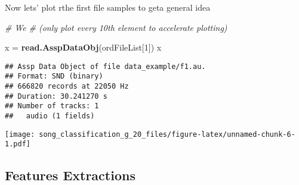 \documentclass[]{article}
\newenvironment{Shaded}{\begin{snugshade}}{\end{snugshade}}
\newcommand{\KeywordTok}[1]{\textcolor[rgb]{0.13,0.29,0.53}{\textbf{#1}}}
\newcommand{\DataTypeTok}[1]{\textcolor[rgb]{0.13,0.29,0.53}{#1}}
\newcommand{\DecValTok}[1]{\textcolor[rgb]{0.00,0.00,0.81}{#1}}
\newcommand{\StringTok}[1]{\textcolor[rgb]{0.31,0.60,0.02}{#1}}
\newcommand{\CommentTok}[1]{\textcolor[rgb]{0.56,0.35,0.01}{\textit{#1}}}
\newcommand{\OtherTok}[1]{\textcolor[rgb]{0.56,0.35,0.01}{#1}}
\newcommand{\OperatorTok}[1]{\textcolor[rgb]{0.81,0.36,0.00}{\textbf{#1}}}
\newcommand{\NormalTok}[1]{#1}
\begin{document}
Now lets' plot rthe first file samples to geta general idea

\begin{Shaded}
\begin{Highlighting}[]
\CommentTok{# We }
\CommentTok{# (only plot every 10th element to accelerate plotting)}

\NormalTok{x =}\StringTok{ }\KeywordTok{read.AsspDataObj}\NormalTok{(ordFileList[}\DecValTok{1}\NormalTok{])}
\NormalTok{x}
\end{Highlighting}
\end{Shaded}

\begin{verbatim}
## Assp Data Object of file data_example/f1.au.
## Format: SND (binary)
## 666820 records at 22050 Hz
## Duration: 30.241270 s
## Number of tracks: 1 
##   audio (1 fields)
\end{verbatim}

\begin{Shaded}
\end{Shaded}

\texttt{[image: song\_classification\_g\_20\_files/figure-latex/unnamed-chunk-6-1.pdf]}

\subsection{Features Extractions}\label{features-extractions}
\end{document}
